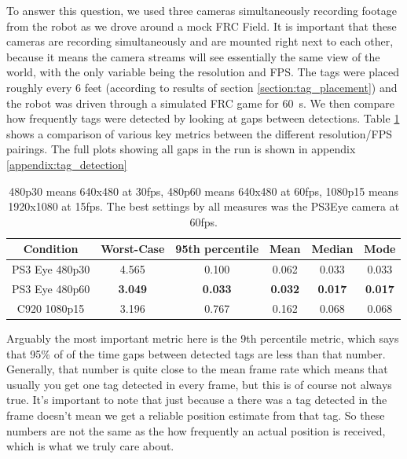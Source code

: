 \documentclass{article}
\begin{document}
    To answer this question, we used three cameras simultaneously recording footage from the robot as we drove around a mock FRC Field. It is important that these cameras are recording simultaneously and are mounted right next to each other, because it means the camera streams will see essentially the same view of the world, with the only variable being the resolution and FPS. The tags were placed roughly every 6 feet (according to results of section \ref{section:tag_placement}) and the robot was driven through a simulated FRC game for \SI{60}{\second}. We then compare how frequently tags were detected by looking at gaps between detections. Table \ref{table:tag_detection_comparison} shows a comparison of various key metrics between the different resolution/FPS pairings. The full plots showing all gaps in the run is shown in appendix \ref{appendix:tag_detection}

    \begin{table}[H]
      \centering
      \begin{tabular}{|c|c|c|c|c|c|} \hline
        Condition & Worst-Case & 95th percentile & Mean & Median & Mode \\ \hline
        PS3 Eye 480p30 & 4.565 & 0.100 & 0.062 & 0.033 & 0.033 \\ \hline
        PS3 Eye 480p60 & \textbf{3.049} & \textbf{0.033} & \textbf{0.032} & \textbf{0.017} & \textbf{0.017} \\ \hline
        C920 1080p15 & 3.196 & 0.767 & 0.162 & 0.068 & 0.068 \\ \hline
      \end{tabular}
      \caption{480p30 means 640x480 at 30fps, 480p60 means 640x480 at 60fps, 1080p15 means 1920x1080 at 15fps. The best settings by all measures was the PS3Eye camera at 60fps.}
      \label{table:tag_detection_comparison}
    \end{table}

    Arguably the most important metric here is the 9th percentile metric, which says that 95\% of of the time gaps between detected tags are less than that number. Generally, that number is quite close to the mean frame rate which means that usually you get one tag detected in every frame, but this is of course not always true. It's important to note that just because a there was a tag detected in the frame doesn't mean we get a reliable position estimate from that tag. So these numbers are not the same as the how frequently an actual position is received, which is what we truly care about.
\end{document}
